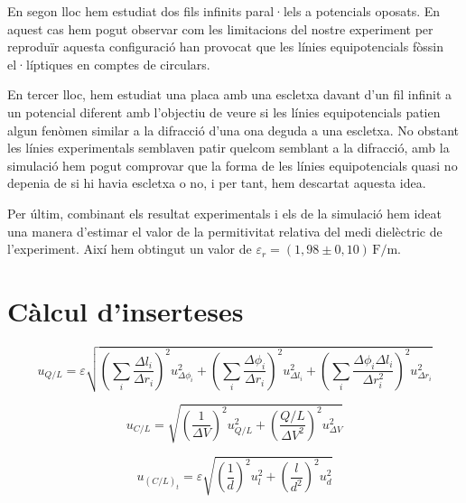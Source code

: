 \documentclass[11pt]{article}
\begin{document}
En segon lloc hem estudiat dos fils infinits paral·lels a potencials oposats. En aquest cas hem pogut observar com les limitacions del nostre experiment per reproduïr aquesta configuració han provocat que les línies equipotencials fòssin el·líptiques en comptes de circulars.

En tercer lloc, hem estudiat una placa amb una escletxa davant d'un fil infinit a un potencial diferent amb l'objectiu de veure si les línies equipotencials patien algun fenòmen similar a la difracció d'una ona deguda a una escletxa. No obstant les línies experimentals semblaven patir quelcom semblant a la difracció, amb la simulació hem pogut comprovar que la forma de les línies equipotencials quasi no depenia de si hi havia escletxa o no, i per tant, hem descartat aquesta idea.

Per últim, combinant els resultat experimentals i els de la simulació hem ideat una manera d'estimar el valor de la permitivitat relativa del medi dielèctric de l'experiment. Així hem obtingut un valor de $\varepsilon_r=(1,98 \pm 0,10)\, \mathrm{F/m}$.

\label{sec: annex}
\section{Càlcul d'inserteses}

\begin{equation}
    u_{Q/L} = \varepsilon \sqrt{
        \left( \sum_i \frac{\Delta l_i}{\Delta r_i} \right)^2 u^2_{\Delta \phi_i} +
        \left( \sum_i \frac{\Delta \phi_i}{\Delta r_i} \right)^2 u^2_{\Delta l_i} +
        \left( \sum_i \frac{\Delta \phi_i \Delta l_i}{\Delta r_i^2} \right)^2 u^2_{\Delta r_i}}
        \label{eq: ins_q}
\end{equation}


\begin{equation}
    u_{C/L} = \sqrt{
        \left( \frac{1}{\Delta V} \right)^2 u^2_{Q/L} +
        \left( \frac{Q/L}{\Delta V^2} \right)^2 u^2_{\Delta V}}
    \label{eq: ins_c}
\end{equation}

\begin{equation}
    u_{(C/L)_t} = \varepsilon \sqrt{
    \left( \frac{1}{d} \right)^2 u^2_l +
    \left( \frac{l}{d^2} \right)^2 u^2_d}
    \label{eq: ins_ct}
\end{equation}
\end{document}
